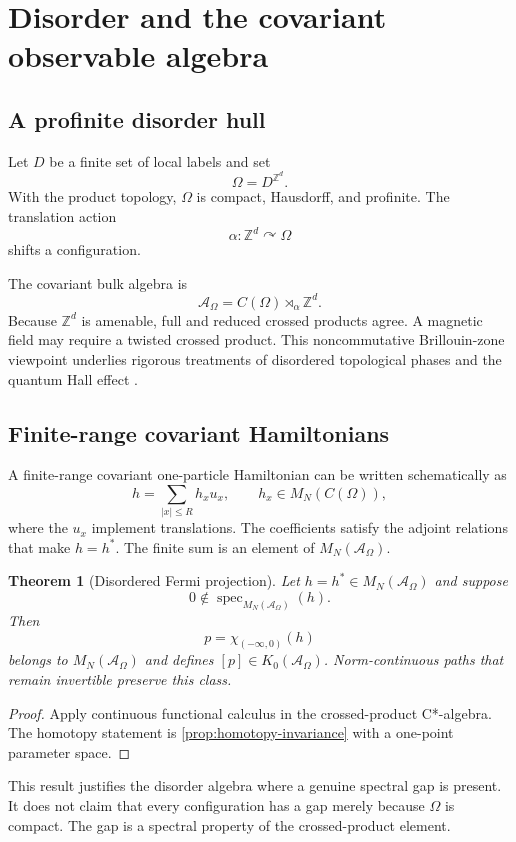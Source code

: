 \documentclass[12pt]{article}
\newtheorem{theorem}{Theorem}[section]
\theoremstyle{definition}
\theoremstyle{remark}
\newcommand{\A}{\mathcal A}
\newcommand{\spec}{\operatorname{spec}}
\newcommand{\Z}{\mathbb Z}
\begin{document}
\section{Disorder and the covariant observable algebra}

\subsection{A profinite disorder hull}

Let $D$ be a finite set of local labels and set
\[
\Omega=D^{\Z^d}.
\]
With the product topology, $\Omega$ is compact, Hausdorff, and profinite.
The translation action
\[
\alpha:\Z^d\curvearrowright\Omega
\]
shifts a configuration.

The covariant bulk algebra is
\[
\A_{\Omega}
=
C(\Omega)\rtimes_{\alpha}\Z^d.
\]
Because $\Z^d$ is amenable, full and reduced crossed products agree.
A magnetic field may require a twisted crossed product.
This noncommutative Brillouin-zone viewpoint underlies rigorous treatments of
disordered topological phases and the quantum Hall effect
\cite{Bellissard1994,ProdanSchulzBaldes2016}.

\subsection{Finite-range covariant Hamiltonians}

A finite-range covariant one-particle Hamiltonian can be written
schematically as
\[
h
=
\sum_{|x|\leq R} h_xu_x,
\qquad
h_x\in M_N(C(\Omega)),
\]
where the $u_x$ implement translations.
The coefficients satisfy the adjoint relations that make $h=h^*$.
The finite sum is an element of $M_N(\A_\Omega)$.

\begin{theorem}[Disordered Fermi projection]
\label{thm:disorder-projection}
Let $h=h^*\in M_N(\A_\Omega)$ and suppose
\[
0\notin\spec_{M_N(\A_\Omega)}(h).
\]
Then
\[
p=\chi_{(-\infty,0)}(h)
\]
belongs to $M_N(\A_\Omega)$ and defines
$[p]\in K_0(\A_\Omega)$.
Norm-continuous paths that remain invertible preserve this class.
\end{theorem}

\begin{proof}
Apply continuous functional calculus in the crossed-product C*-algebra.
The homotopy statement is \cref{prop:homotopy-invariance} with a one-point
parameter space.
\end{proof}

This result justifies the disorder algebra where a genuine spectral gap is
present.
It does not claim that every configuration has a gap merely because
$\Omega$ is compact.
The gap is a spectral property of the crossed-product element.
\end{document}
